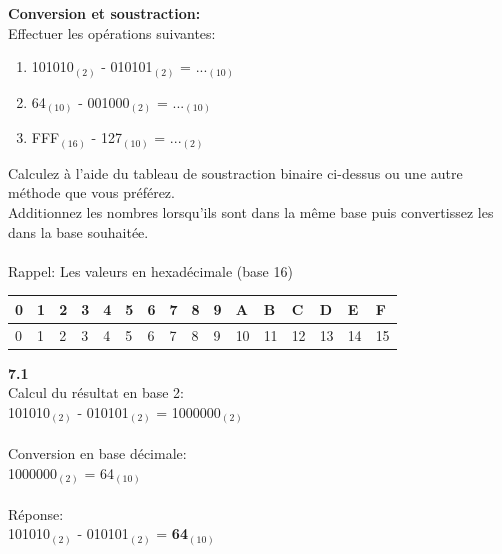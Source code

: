 \begin{Exercice}[20 minutes] \textbf{Conversion et soustraction:}\\
    Effectuer les opérations suivantes:
    \begin{enumerate}
        \item 101010$_{(2)}$ - 010101$_{(2)}$ = ...$_{(10)}$
        \item 64$_{(10)}$ - 001000$_{(2)}$ = ...$_{(10)}$
        \item FFF$_{(16)}$ - 127$_{(10)}$ = ...$_{(2)}$
    \end{enumerate}
    \begin{conseil}
            Calculez à l'aide du tableau de soustraction binaire ci-dessus ou une autre méthode que vous préférez.\\
            Additionnez les nombres lorsqu'ils sont dans la même base puis convertissez les dans la base souhaitée.\\\\
            Rappel: Les valeurs en hexadécimale (base 16)\\
            \begin{tabular}{| C{0.030\textwidth} | C{0.030\textwidth} | C{0.030\textwidth} | C{0.030\textwidth} | C{0.030\textwidth} | C{0.030\textwidth} | C{0.030\textwidth} | C{0.030\textwidth} | C{0.030\textwidth} | C{0.030\textwidth} | C{0.030\textwidth} | C{0.030\textwidth} | C{0.030\textwidth} | C{0.030\textwidth} | C{0.030\textwidth} | C{0.030\textwidth} |} 
            \hline
            \textbf{0} & \textbf{1} & \textbf{2} & \textbf{3} & \textbf{4} & \textbf{5} & \textbf{6} & \textbf{7} & \textbf{8} & \textbf{9} & \textbf{A} & \textbf{B} & \textbf{C} & \textbf{D} & \textbf{E} & \textbf{F}\\ [0.5ex]
             & 1 & 2 & 3 & 4 & 5 & 6 & 7 & 8 & 9 & 10 & 11 & 12 & 13 & 14 & 15 \\ [0.5ex] 
            \hline
        \end{tabular}
    \end{conseil}
    \begin{solution} \textbf{7.1}\\
        Calcul du résultat en base 2:\\
        101010$_{(2)}$ - 010101$_{(2)}$ = 1000000$_{(2)}$\\\\
        Conversion en base décimale:\\
        1000000$_{(2)}$ = 64$_{(10)}$\\\\
        Réponse:\\
        101010$_{(2)}$ - 010101$_{(2)}$ = \textbf{64$_{(10)}$}\\
    \end{solution}
    

\end{Exercice}
